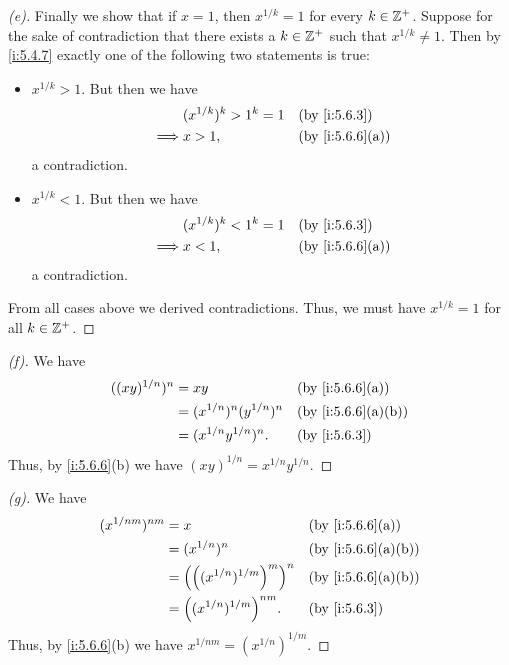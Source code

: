 \begin{proof}[(e)]
  Finally we show that if \(x = 1\), then \(x^{1 / k} = 1\) for every \(k \in \mathbb{Z}^+\).
  Suppose for the sake of contradiction that there exists a \(k \in \mathbb{Z}^+\) such that \(x^{1 / k} \neq 1\).
  Then by \cref{i:5.4.7} exactly one of the following two statements is true:
  \begin{itemize}
    \item \(x^{1 / k} > 1\).
          But then we have
          \begin{align*}
                     & (x^{1 / k})^k > 1^k = 1 &  & \by{i:5.6.3}    \\
            \implies & x > 1,                  &  & \by{i:5.6.6}[a]
          \end{align*}
          a contradiction.
    \item \(x^{1 / k} < 1\).
          But then we have
          \begin{align*}
                     & (x^{1 / k})^k < 1^k = 1 &  & \by{i:5.6.3}    \\
            \implies & x < 1,                  &  & \by{i:5.6.6}[a]
          \end{align*}
          a contradiction.
  \end{itemize}
  From all cases above we derived contradictions.
  Thus, we must have \(x^{1 / k} = 1\) for all \(k \in \mathbb{Z}^+\).
\end{proof}

\begin{proof}[(f)]
  We have
  \begin{align*}
    ((xy)^{1 / n})^n & = xy                          &  & \by{i:5.6.6}[a]   \\
                     & = (x^{1 / n})^n (y^{1 / n})^n &  & \by{i:5.6.6}[a,b] \\
                     & = (x^{1 / n} y^{1 / n})^n.    &  & \by{i:5.6.3}
  \end{align*}
  Thus, by \cref{i:5.6.6}(b) we have \((xy)^{1 / n} = x^{1 / n} y^{1 / n}\).
\end{proof}

\begin{proof}[(g)]
  We have
  \begin{align*}
    (x^{1 / nm})^{nm} & = x                                 &  & \by{i:5.6.6}[a]   \\
                      & = (x^{1 / n})^n                     &  & \by{i:5.6.6}[a,b] \\
                      & = \pa{\pa{(x^{1 / n})^{1 / m}}^m}^n &  & \by{i:5.6.6}[a,b] \\
                      & = \pa{(x^{1 / n})^{1 / m}}^{nm}.    &  & \by{i:5.6.3}
  \end{align*}
  Thus, by \cref{i:5.6.6}(b) we have \(x^{1 / nm} = (x^{1 / n})^{1 / m}\).
\end{proof}

